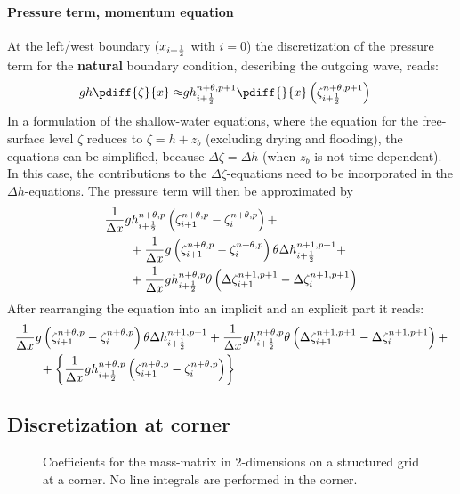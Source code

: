 \paragraph*{Pressure term, momentum equation}
At the left/west boundary ($x_{i+\frac{1}{2}}$ with $i=0$) the discretization of the pressure term for the \textbf{natural} boundary condition, describing the outgoing wave, reads:
\begin{align}
    gh \pdiff{\zeta}{x} \approx
    & g h^{n+\theta,p+1}_{i+\half} \pdiff{}{x} \left( \zeta^{n+\theta,p+1}_{i+\half}\right)
\end{align}
In a formulation of the shallow-water equations, where the equation for the free-surface level $\zeta$ reduces to $\zeta = h + z_b$ (excluding drying and flooding), the equations can be simplified, because $\Delta \zeta = \Delta h$ (when $z_b$ is not time dependent).
In this case, the contributions to the $\Delta \zeta$-equations need to be incorporated in the $\Delta h$-equations.
The pressure term will then be approximated by
\begin{align}
    & \frac{1}{\Delta x} g h^{n+\theta,p}_{i+\frac{1}{2}} \left( \zeta^{n+\theta,p}_{i+1} - \zeta^{n+\theta,p}_{i}  \right) +
    \nonumber \\*
    & \qquad + \frac{1}{\Delta x}  g \left(  \zeta^{n+\theta,p}_{i+1} - \zeta^{n+\theta,p}_{i} \right) \theta \Delta h^{n+1, p+1}_{i+\frac{1}{2}} +
    \nonumber \\*
    & \qquad +   \frac{1}{\Delta x} g h^{n+\theta, p}_{i+\frac{1}{2}}
    \theta \left( \Delta \zeta^{n+1,p+1}_{i+1}  - \Delta \zeta^{n+1,p+1}_{i}\right)
\end{align}
After rearranging the equation into an implicit and an explicit part it reads:
\begin{align}
    & \frac{1}{\Delta x}  g \left(  \zeta^{n+\theta,p}_{i+1} - \zeta^{n+\theta,p}_{i} \right) \theta \Delta h^{n+1, p+1}_{i+\frac{1}{2}} +   \frac{1}{\Delta x} g h^{n+\theta, p}_{i+\frac{1}{2}}
    \theta \left( \Delta \zeta^{n+1,p+1}_{i+1}  - \Delta \zeta^{n+1,p+1}_{i}\right) +
    \nonumber \\*
    & \qquad + \left\{
    \frac{1}{\Delta x} g h^{n+\theta,p}_{i+\frac{1}{2}} \left( \zeta^{n+\theta,p}_{i+1} - \zeta^{n+\theta,p}_{i}  \right)  \right\}
\end{align}

\subsection{Discretization at corner}
\begin{figure}[H]
    \begin{center}
        \def\svgwidth{0.8\textwidth} %
        \resizebox{0.65\textwidth}{!}{
            
        }
    \end{center}
    \caption{Coefficients for the mass-matrix in 2-dimensions on a structured grid at a corner. No line integrals are performed in the corner.}
    \label{fig:structured_grid_at_corner}
\end{figure}
